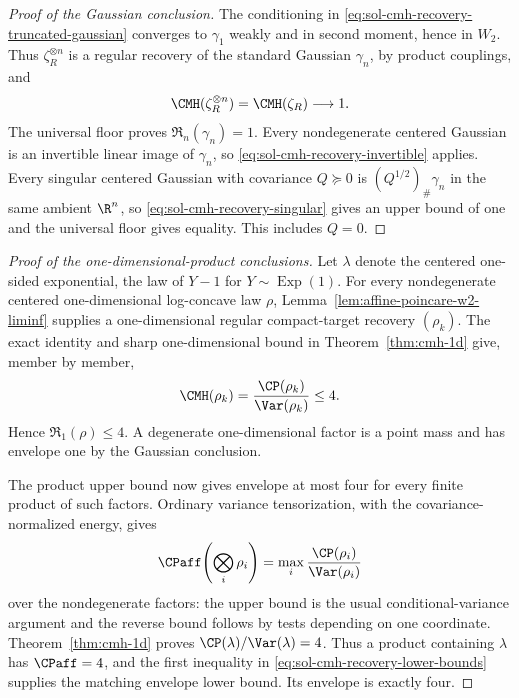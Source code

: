 \documentclass[../main.tex]{subfiles}
\begin{document}
\begin{proof}[Proof of the Gaussian conclusion]
The conditioning in \eqref{eq:sol-cmh-recovery-truncated-gaussian} converges to $\gamma_1$
weakly and in second moment, hence in $W_2$.  Thus $\zeta_R^{\otimes n}$ is a regular recovery
of the standard Gaussian $\gamma_n$, by product couplings, and
\[
  \CMH(\zeta_R^{\otimes n})=\CMH(\zeta_R)\longrightarrow1.
\]
The universal floor proves $\mathfrak R_n(\gamma_n)=1$.  Every nondegenerate centered Gaussian
is an invertible linear image of $\gamma_n$, so \eqref{eq:sol-cmh-recovery-invertible} applies.
Every singular centered Gaussian with covariance $Q\succeq0$ is
$(Q^{1/2})_\#\gamma_n$ in the same ambient $\R^n$, so
\eqref{eq:sol-cmh-recovery-singular} gives an upper bound of one and the universal floor gives
equality.  This includes $Q=0$.
\end{proof}

\begin{proof}[Proof of the one-dimensional-product conclusions]
Let $\lambda$ denote the centered one-sided exponential, the law of $Y-1$ for
$Y\sim\operatorname{Exp}(1)$.  For every nondegenerate centered one-dimensional log-concave
law $\rho$, Lemma~\ref{lem:affine-poincare-w2-liminf} supplies a one-dimensional regular
compact-target recovery $(\rho_k)$.  The exact identity and sharp one-dimensional bound in
Theorem~\ref{thm:cmh-1d} give, member by member,
\[
  \CMH(\rho_k)
  =\frac{\CP(\rho_k)}{\Var(\rho_k)}\le4.
\]
Hence $\mathfrak R_1(\rho)\le4$.  A degenerate one-dimensional factor is a point mass and has
envelope one by the Gaussian conclusion.

The product upper bound now gives envelope at most four for every finite product of such
factors.  Ordinary variance tensorization, with the covariance-normalized energy, gives
\[
  \CPaff\!\left(\bigotimes_i\rho_i\right)
  =\max_i\frac{\CP(\rho_i)}{\Var(\rho_i)}
\]
over the nondegenerate factors: the upper bound is the usual conditional-variance argument and
the reverse bound follows by tests depending on one coordinate.  Theorem~\ref{thm:cmh-1d}
proves $\CP(\lambda)/\Var(\lambda)=4$.  Thus a product containing $\lambda$ has
$\CPaff=4$, and the first inequality in
\eqref{eq:sol-cmh-recovery-lower-bounds} supplies the matching envelope lower bound.  Its
envelope is exactly four.
\end{proof}
\end{document}
